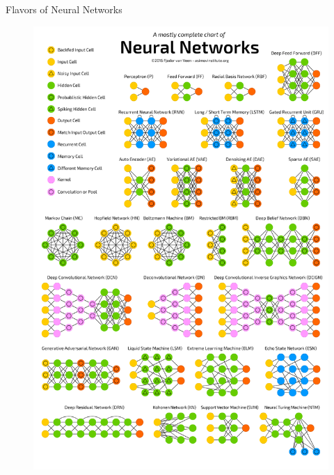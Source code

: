 \documentclass[]{beamer}
\begin{document}
\begin{frame}
   {Flavors of Neural Networks}
   \vspace{-0.2cm}
   \begin{figure}
      \includegraphics[scale=0.07]{figures/neuralnetworks.png}
   \end{figure}
\end{frame}
\end{document}
